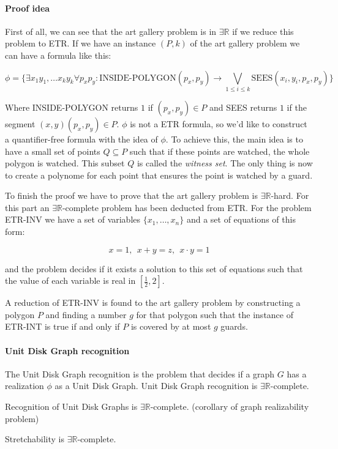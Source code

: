 \paragraph{Proof idea} First of all, we can see that the art gallery problem
is in $\exists \mathbb{R}$ if we reduce this problem to ETR. If we have an
instance $(P,k)$ of the art gallery problem we can have a formula
\cite{EFRAT2006238} like this:

$$\phi = \{\exists x_1y_1,\dots x_ky_k \forall p_xp_y :
\text{INSIDE-POLYGON}(p_x,p_y) \to \bigvee_{1 \leq i \leq k}
\text{SEES}(x_i,y_i,p_x,p_y)\}$$

Where INSIDE-POLYGON returns $1$ if $(p_x,p_y) \in P$ and SEES returns $1$ if
the segment $(x,y)(p_x,p_y) \in P$. $\phi$ is not a ETR formula, so we'd like
to construct a quantifier-free formula with the idea of $\phi$. To achieve this,
the main idea is to have a small set of points $Q \subseteq P$ such that if these
points are watched, the whole polygon is watched. This subset $Q$ is called
the \textit{witness set}. The only thing is now to create a polynome for each
point that ensures the point is watched by a guard.

To finish the proof we have to prove that the art gallery problem is $\exists
\mathbb{R}$-hard. For this part an $\exists \mathbb{R}$-complete
problem has been deducted from ETR. For the problem ETR-INV we have a set of
variables $\{x_1,\dots,x_n\}$ and a set of equations of this form:

$$x = 1,\ \ x + y = z,\ \ x \cdot y = 1 $$

and the problem decides if it exists a solution to this set of equations such
that the value of each variable is real in $[\frac{1}{2},2]$.

A reduction of ETR-INV is found to the art gallery problem by constructing
a polygon $P$ and finding a number $g$ for that polygon such that the instance
of ETR-INT is true if and only if $P$ is covered by at most $g$ guards.

\paragraph{Unit Disk Graph recognition} The Unit Disk Graph recognition is
the problem that decides if a graph $G$ has a realization $\phi$ as a Unit
Disk Graph. Unit Disk Graph recognition is $\exists \mathbb{R}$-complete.

Recognition of Unit Disk Graphs is $\exists \mathbb{R}$-complete. (corollary of graph realizability problem)\cite{Schaefer2013}

Stretchability is $\exists \mathbb{R}$-complete.
